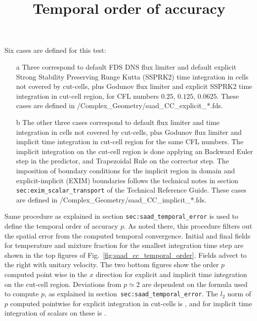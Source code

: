 \documentclass[12pt]{article}
\begin{document}
\title{Temporal order of accuracy}

Six cases are defined for this test:
%
\begin{enumerate}
 \item[a]  Three correspond to default FDS DNS flux limiter and default explicit Strong Stability Preserving Runge Kutta (SSPRK2) time integration in cells not covered by cut-cells, plus Godunov flux limiter and explicit SSPRK2 time integration in cut-cell region, for CFL numbers $0.25$, $0.125$, $0.0625$. These cases are defined in {\ct /Complex\_Geometry/saad\_CC\_explicit\_*.fds}.

  \item[b] The other three cases correspond to default flux limiter and time integration in cells not covered by cut-cells, plus Godunov flux limiter and implicit time integration in cut-cell region for the same CFL numbers. The implicit integration on the cut-cell region is done applying an Backward Euler step in the predictor, and Trapezoidal Rule on the corrector step. The imposition of boundary conditions for the implicit region in domain and explicit-implicit (EXIM) boundaries follows the technical notes in section \texttt{sec:exim\_scalar\_transport} of the Technical Reference Guide. These cases are defined in {\ct /Complex\_Geometry/saad\_CC\_implicit\_*.fds}.

\end{enumerate}
%

Same procedure as explained in section  \texttt{sec:saad\_temporal\_error} is used to define the temporal order of accuracy $p$. As noted there, this procedure filters out the spatial error from the computed temporal convergence. Initial and final fields for temperature and mixture fraction for the smallest integration time step are shown in the top figures of Fig.~\ref{fig:saad_cc_temporal_order}. Fields advect to the right with unitary velocity. The two bottom figures show the order $p$ computed point wise in the $x$ direction for explicit and implicit time integration on the cut-cell region. Deviations from $p \simeq 2$ are dependent on the formula used to compute $p$, as explained in section~\texttt{sec:saad\_temporal\_error}.
The $l_2$ norm of $p$ computed pointwise for explicit integration in cut-cells is \!, and for implicit time integration of scalars on these is  \!.
\end{document}
